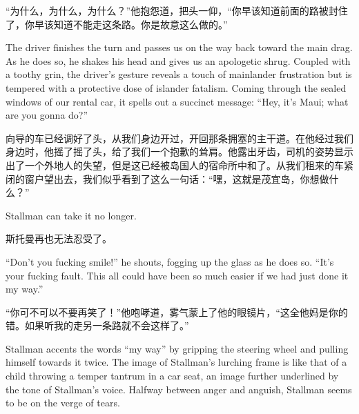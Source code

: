 \ifdefined\chs
``为什么，为什么，为什么？''他抱怨道，把头一仰，``你早该知道前面的路被封住了，你早该知道不能走这条路。你是故意这么做的。'' %
\fi

\ifdefined\eng
The driver finishes the turn and passes us on the way back toward the main drag. As he does so, he shakes his head and gives us an apologetic shrug. Coupled with a toothy grin, the driver's gesture reveals a touch of mainlander frustration but is tempered with a protective dose of islander fatalism. Coming through the sealed windows of our rental car, it spells out a succinct message: ``Hey, it's Maui; what are you gonna do?''
\fi

\ifdefined\chs
向导的车已经调好了头，从我们身边开过，开回那条拥塞的主干道。在他经过我们身边时，他摇了摇了头，给了我们一个抱歉的耸肩。他露出牙齿，司机的姿势显示出了一个外地人的失望，但是这已经被岛国人的宿命所中和了。从我们租来的车紧闭的窗户望出去，我们似乎看到了这么一句话：``嘿，这就是茂宜岛，你想做什么？''
\fi

\ifdefined\eng
Stallman can take it no longer.
\fi

\ifdefined\chs
斯托曼再也无法忍受了。
\fi

\ifdefined\eng
``Don't you fucking smile!'' he shouts, fogging up the glass as he does so. ``It's your fucking fault. This all could have been so much easier if we had just done it my way.'' %
\fi

\ifdefined\chs
``你可不可以不要再笑了！''他咆哮道，雾气蒙上了他的眼镜片，``这全他妈是你的错。如果听我的走另一条路就不会这样了。''%
\fi

\ifdefined\eng
Stallman accents the words ``my way'' by gripping the steering wheel and pulling himself towards it twice. The image of Stallman's lurching frame is like that of a child throwing a temper tantrum in a car seat, an image further underlined by the tone of Stallman's voice. Halfway between anger and anguish, Stallman seems to be on the verge of tears.
\fi

